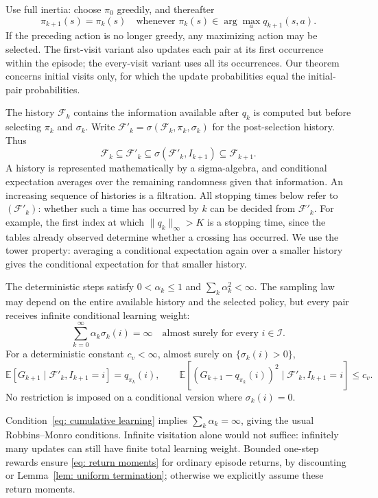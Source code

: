 Use full inertia: choose $\pi_0$ greedily, and thereafter
\begin{equation}\label{eq:greedy-pol-tie-breaking}
\pi_{k+1}(s)=\pi_k(s)\quad\text{whenever }\pi_k(s)\in\arg\max_a q_{k+1}(s,a).
\end{equation}
If the preceding action is no longer greedy, any maximizing action may be selected.
The first-visit variant also updates each pair at its first occurrence within the episode; the every-visit variant uses all its occurrences. Our theorem concerns initial visits only, for which the update probabilities equal the initial-pair probabilities.


The history $\mathcal F_k$ contains the information available after $q_k$ is computed but before selecting $\pi_k$ and $\sigma_k$. Write $\mathcal F'_k=\sigma(\mathcal F_k,\pi_k,\sigma_k)$ for the post-selection history. Thus
\[
\mathcal F_k\subseteq\mathcal F'_k\subseteq\sigma(\mathcal F'_k,I_{k+1})\subseteq\mathcal F_{k+1}.
\]
A history is represented mathematically by a sigma-algebra, and conditional expectation averages over the remaining randomness given that information. An increasing sequence of histories is a filtration. All stopping times below refer to $(\mathcal F'_k)$: whether such a time has occurred by $k$ can be decided from $\mathcal F'_k$. For example, the first index at which $\|q_k\|_\infty>K$ is a stopping time, since the tables already observed determine whether a crossing has occurred. We use the tower property: averaging a conditional expectation again over a smaller history gives the conditional expectation for that smaller history.

\begin{assumption}\label{asp: standing}
The deterministic steps satisfy $0<\alpha_k\le1$ and $\sum_k\alpha_k^2<\infty$. The sampling law may depend on the entire available history and the selected policy, but every pair receives infinite conditional learning weight:
\begin{equation}\label{eq: cumulative learning}
\sum_{k=0}^\infty\alpha_k\sigma_k(i)=\infty\quad\text{almost surely for every }i\in\mathcal I.
\end{equation}
For a deterministic constant $c_v<\infty$, almost surely on $\{\sigma_k(i)>0\}$,
\begin{equation}\label{eq: return moments}
\mathbb E[G_{k+1}\mid\mathcal F'_k,I_{k+1}=i]=q_{\pi_k}(i),\qquad
\mathbb E[(G_{k+1}-q_{\pi_k}(i))^2\mid\mathcal F'_k,I_{k+1}=i]\le c_v.
\end{equation}
No restriction is imposed on a conditional version where $\sigma_k(i)=0$.
\end{assumption}
Condition~\eqref{eq: cumulative learning} implies $\sum_k\alpha_k=\infty$, giving the usual Robbins--Monro conditions. Infinite visitation alone would not suffice: infinitely many updates can still have finite total learning weight. Bounded one-step rewards ensure \eqref{eq: return moments} for ordinary episode returns, by discounting or Lemma~\ref{lem: uniform termination}; otherwise we explicitly assume these return moments.

